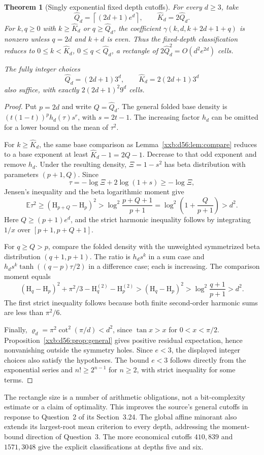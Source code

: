 \documentclass[11pt,a4paper]{article}
\numberwithin{equation}{section}
\newtheorem{theorem}{Theorem}[section]
\theoremstyle{definition}
\theoremstyle{remark}
\theoremstyle{plain}
\begin{document}
\begin{theorem}[Singly exponential fixed depth cutoffs]\label{xxb:d56:thm:general}
For every $d\ge3$, take
\[
 \widehat Q_d=\left\lceil(2d+1)e^d\right\rceil,\qquad \widehat K_d=2\widehat Q_d.
\]
For $k,q\ge0$ with $k\ge\widehat K_d$ or $q\ge\widehat Q_d$, the coefficient
$\gamma(k,d,k+2d+1+q)$ is nonzero unless $q=2d$ and $k+d$ is even. Thus the
fixed-depth classification reduces to $0\le k<\widehat K_d$,
$0\le q<\widehat Q_d$, a rectangle of $2\widehat Q_d^2=O(d^2e^{2d})$ cells.

The fully integer choices
\[
 \widehat Q_d=(2d+1)3^d,\qquad \widehat K_d=2(2d+1)3^d
\]
also suffice, with exactly $2(2d+1)^2 9^d$ cells.
\end{theorem}
\begin{proof}
Put $p=2d$ and write $Q=\widehat Q_d$. The general folded base density is
$(t(1-t))^p h_d(\tau)s^r$, with $s=2t-1$. The increasing factor $h_d$ can be
omitted for a lower bound on the mean of $\tau^2$.

For $k\ge\widehat K_d$, the same base comparison as
Lemma~\ref{xxb:d56:lem:compare} reduces to a base exponent at least
$\widehat K_d-1=2Q-1$. Decrease to that odd exponent and remove $h_d$. Under
the resulting density, $\Xi=1-s^2$ has beta distribution with parameters
$(p+1,Q)$. Since
\[
 \tau=-\log\Xi+2\log(1+s)\ge-\log\Xi,
\]
Jensen's inequality and the beta logarithmic moment give
\[
 \mathbb E\tau^2\ge(\mathrm H_{p+Q}-\mathrm H_p)^2
 >\log^2\frac{p+Q+1}{p+1}
 =\log^2\left(1+\frac{Q}{p+1}\right)>d^2.
\]
Here $Q\ge(p+1)e^d$, and the strict harmonic inequality follows by integrating
$1/x$ over $[p+1,p+Q+1]$.

For $q\ge Q>p$, compare the folded density with the unweighted symmetrized
beta distribution $(q+1,p+1)$. The ratio is $h_ds^k$ in a sum case and
$h_ds^k\tanh((q-p)\tau/2)$ in a difference case; each is increasing. The
comparison moment equals
\[
 (\mathrm H_q-\mathrm H_p)^2+\pi^2/3
 -\mathrm H_q^{(2)}-\mathrm H_p^{(2)}
 >(\mathrm H_q-\mathrm H_p)^2
 >\log^2\frac{q+1}{p+1}>d^2.
\]
The first strict inequality follows because both finite second-order harmonic
sums are less than $\pi^2/6$.

Finally, $\varrho_d=\pi^2\cot^2(\pi/d)<d^2$, since $\tan x>x$ for
$0<x<\pi/2$. Proposition~\ref{xxb:d56:prop:general} gives positive residual
expectation, hence nonvanishing outside the symmetry holes. Since $e<3$, the
displayed integer choices also satisfy the hypotheses. The bound $e<3$ follows
directly from the exponential series and $n!\ge2^{n-1}$ for $n\ge2$, with
strict inequality for some terms.
\end{proof}
The rectangle size is a number of arithmetic obligations, not a
bit-complexity estimate or a claim of optimality. This improves the source's
general cutoffs in response to Question~2 of its Section~3.24. The global
affine minorant also extends its largest-root mean criterion to every depth,
addressing the moment-bound direction of Question~3. The more economical
cutoffs $410,839$ and $1571,3048$ give the explicit classifications at depths
five and six.
\end{document}
